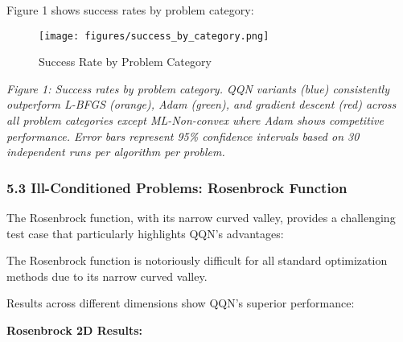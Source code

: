 Figure 1 shows success rates by problem category:

\begin{figure}
\centering
\texttt{[image: figures/success\_by\_category.png]}
\caption{Success Rate by Problem Category}
\end{figure}

\emph{Figure 1: Success rates by problem category. QQN variants (blue) consistently outperform L-BFGS (orange), Adam (green), and gradient descent (red) across all problem categories except ML-Non-convex where Adam shows competitive performance. Error bars represent 95\% confidence intervals based on 30 independent runs per algorithm per problem.}

\hypertarget{ill-conditioned-problems-rosenbrock-function}{%
\subsubsection{5.3 Ill-Conditioned Problems: Rosenbrock Function}\label{ill-conditioned-problems-rosenbrock-function}}

The Rosenbrock function, with its narrow curved valley, provides a challenging test case that particularly highlights QQN's advantages:

The Rosenbrock function is notoriously difficult for all standard optimization methods due to its narrow curved valley.

Results across different dimensions show QQN's superior performance:

\textbf{Rosenbrock 2D Results:}

